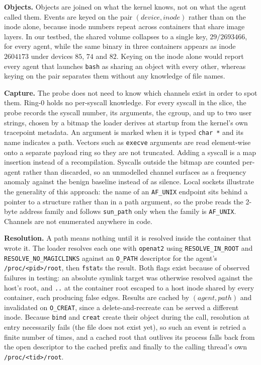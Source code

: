 \noindent\textbf{Objects.} Objects are joined on what the kernel knows, not on what the agent called them. Events are keyed on the pair $(\mathit{device},\mathit{inode})$ rather than on the inode alone, because inode numbers repeat across containers that share image layers. In our testbed, the shared volume collapses to a single key, $29/2693466$, for every agent, while the same binary in three containers appears as inode $2604173$ under devices $85$, $74$ and $82$. Keying on the inode alone would report every agent that launches \texttt{bash} as sharing an object with every other, whereas keying on the pair separates them without any knowledge of file names.

\noindent\textbf{Capture.} The probe does not need to know which channels exist in order to spot them. Ring-0 holds no per-syscall knowledge. For every syscall in the slice, the probe records the syscall number, its arguments, the cgroup, and up to two user strings, chosen by a bitmap the loader derives at startup from the kernel's own tracepoint metadata. An argument is marked when it is typed \texttt{char *} and its name indicates a path. Vectors such as \texttt{execve} arguments are read element-wise onto a separate payload ring so they are not truncated. Adding a syscall is a map insertion instead of a recompilation. Syscalls outside the bitmap are counted per-agent rather than discarded, so an unmodelled channel surfaces as a frequency anomaly against the benign baseline instead of as silence. Local sockets illustrate the generality of this approach: the name of an \texttt{AF\_UNIX} endpoint sits behind a pointer to a structure rather than in a path argument, so the probe reads the 2-byte address family and follows \texttt{sun\_path} only when the family is \texttt{AF\_UNIX}. Channels are not enumerated anywhere in code.

\noindent\textbf{Resolution.} A path means nothing until it is resolved inside the container that wrote it. The loader resolves each one with \texttt{openat2} using \texttt{RESOLVE\_IN\_ROOT} and \texttt{RESOLVE\_NO\_MAGICLINKS} against an \texttt{O\_PATH} descriptor for the agent's \texttt{/proc/<pid>/root}, then \texttt{fstat}s the result. Both flags exist because of observed failures in testing: an absolute symlink target was otherwise resolved against the host's root, and \texttt{..} at the container root escaped to a host inode shared by every container, each producing false edges. Results are cached by $(\mathit{agent},\mathit{path})$ and invalidated on \texttt{O\_CREAT}, since a delete-and-recreate can be served a different inode. Because \texttt{bind} and \texttt{creat} create their object during the call, resolution at entry necessarily fails (the file does not exist yet), so such an event is retried a finite number of times, and a cached root that outlives its process falls back from the open descriptor to the cached prefix and finally to the calling thread's own \texttt{/proc/<tid>/root}.

